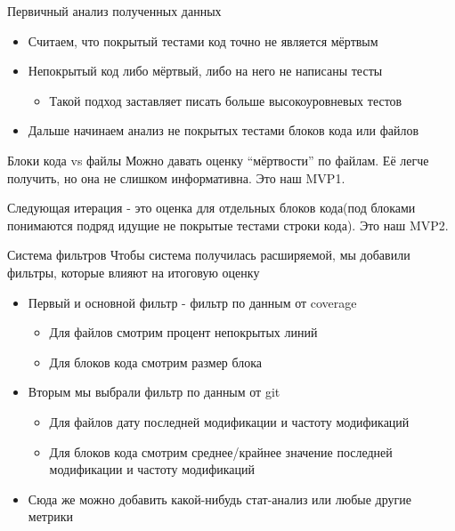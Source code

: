 \documentclass[aspectratio=169]{beamer}
\newcommand{\myskip}{\vspace{\baselineskip}}
\begin{document}
\begin{frame}{Первичный анализ полученных данных}
    \begin{itemize}
        \item Считаем, что покрытый тестами код точно не является мёртвым
        \item Непокрытый код либо мёртвый, либо на него не написаны тесты
              \begin{itemize}
                  \item Такой подход заставляет писать больше высокоуровневых тестов
              \end{itemize}
        \item Дальше начинаем анализ не покрытых тестами блоков кода или файлов
    \end{itemize}
\end{frame}

\begin{frame}{Блоки кода vs файлы}
    Можно давать оценку \enquote{мёртвости} по файлам. Её легче получить, но она не слишком информативна. Это наш MVP1.

    \myskip
    Следующая итерация - это оценка для отдельных блоков кода(под блоками понимаются подряд идущие не покрытые тестами строки кода). Это наш MVP2.
\end{frame}


\begin{frame}{Система фильтров}
    Чтобы система получилась расширяемой, мы добавили фильтры, которые влияют на итоговую оценку
    \begin{itemize}
        \item Первый и основной фильтр - фильтр по данным от coverage
              \begin{itemize}
                  \item Для файлов смотрим процент непокрытых линий
                  \item Для блоков кода смотрим размер блока
              \end{itemize}
        \item Вторым мы выбрали фильтр по данным от git
              \begin{itemize}
                  \item Для файлов дату последней модификации и частоту модификаций
                  \item Для блоков кода смотрим среднее/крайнее значение последней модификации и частоту модификаций
              \end{itemize}
        \item Сюда же можно добавить какой-нибудь стат-анализ или любые другие метрики
    \end{itemize}
\end{frame}
\end{document}
